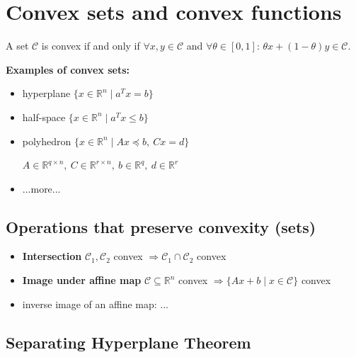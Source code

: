 
\section{Convex sets and convex functions}

\begin{definition}
  A set $\mathcal{C}$ is convex if and only if
  $\forall x,y \in \mathcal{C}$ and
  $\forall \theta \in [0,1]$: \quad
  $\theta x + (1-\theta)y \in \mathcal{C}$.
\end{definition}



\textbf{Examples of convex sets:}
\begin{itemize}
  \item
    hyperplane $\{x \in \mathbb{R}^n \mid a^T x=b\}$
  \item
    half-space $\{x \in \mathbb{R}^n \mid a^T x\le b\}$
  \item
    polyhedron $\{x \in \mathbb{R}^n \mid Ax \preceq b ,\ Cx = d\}$

    $A \in \mathbb{R}^{q\times n},\ C \in \mathbb{R}^{r\times n},\ b
    \in \mathbb{R}^{q},\ d\in \mathbb{R}^{r}$
  \item
    ...more...

\end{itemize}

\subsection{Operations that preserve convexity (sets)}

\begin{itemize}
  \item \textbf{Intersection}
    $\mathcal{C}_1, \mathcal{C}_2$ convex $\Rightarrow \mathcal{C}_1
    \cap \mathcal{C}_2$ convex
  \item \textbf{Image under affine map}
    $\mathcal{C} \subseteq  \mathbb{R}^{n}$ convex
    $\Rightarrow \{Ax+b \mid x \in \mathcal{C} \}$ convex
  \item inverse image of an affine map:
    ...
\end{itemize}

\subsection{Separating Hyperplane Theorem}

